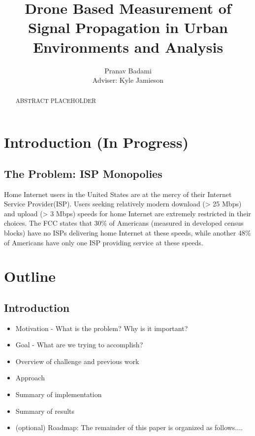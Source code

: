 \documentclass[pageno]{jpaper}
\begin{document}
\title{
Drone Based Measurement of Signal Propagation in Urban Environments and Analysis}

\author{Pranav Badami\\Adviser: Kyle Jamieson}

\date{}
\maketitle

\thispagestyle{empty}
\doublespacing

\begin{abstract}
ABSTRACT PLACEHOLDER
\end{abstract}

\section{Introduction (In Progress)}
\subsection{The Problem: ISP Monopolies}
Home Internet users in the United States are at the mercy of their Internet Service Provider(ISP). Users seeking relatively modern download (> 25 Mbps) and upload (> 3 Mbps) speeds for home Internet are extremely restricted in their choices. The FCC states that 30\% of Americans (measured in developed census blocks) have no ISPs delivering home Internet at these speeds, while another 48\% of Americans have only one ISP providing service at these speeds\cite{fcc15}. 
 
\section{Outline}  

\subsection{Introduction}
\begin{itemize}
	\item Motivation - What is the problem? Why is it important?
	\item Goal - What are we trying to accomplish?
	\item Overview of challenge and previous work 
	\item Approach 
	\item Summary of implementation
	\item Summary of results
	\item (optional) Roadmap: The remainder of this paper is organized as follows....
\end{itemize}
\end{document}
